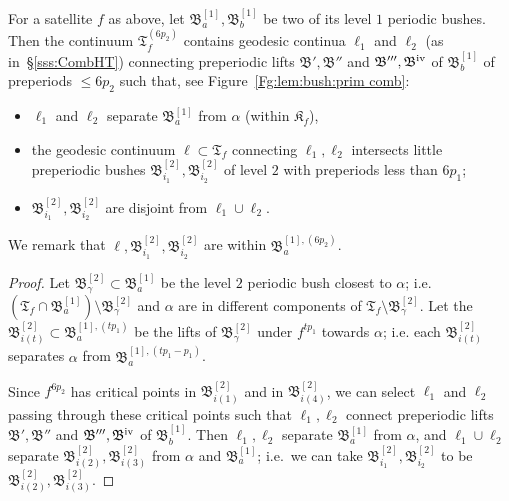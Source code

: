 \documentclass{amsart}
\newcommand{\filled}{{\mathfrak K }}
\newcommand{\Hub}{{\mathfrak T}}
\newcommand{\bush}{{\mathfrak B }}
\newcommand{\1}{{\mathbb 1 }}
\newcommand{\rn}[1]{\text{\romannumeral#1}}%
\begin{document}
\begin{lem} 
\label{lem:bush:prim comb} For a satellite $f$ as above, let $\bush^{[1]}_{a}, \bush^{[1]}_{b}$ be two of its level $1$ periodic bushes. Then the continuum $\Hub^{(6p_2)}_f$ contains geodesic continua $\ell_1$ and $\ell_2$ (as in~\S\ref{sss:CombHT}) connecting preperiodic lifts $\bush',\bush''$  and $\bush''',\bush^\rn{4}$ of $\bush^{[1]}_b$ of preperiods $\le 6 p_2$ such that, see Figure~\ref{Fg:lem:bush:prim comb}:
\begin{itemize}
\item $\ell_1$ and $\ell_2$ separate $\bush^{[1]}_a$ from $\alpha$ (within $\filled_f$),
\item the geodesic continuum  $\ell\subset \Hub_f$ connecting $\ell_1, \ell_2$ intersects little preperiodic bushes $\bush_{i_1}^{[2]},\bush^{[2]}_{i_2}$ of level $2$ with preperiods less than $6p_1$;
\item  $\bush_{i_1}^{[2]},\bush^{[2]}_{i_2}$ are disjoint from $\ell_1\cup \ell_2$.
\end{itemize}
 \end{lem}
 \noindent We remark that $\ell,\bush_{i_1}^{[2]},\bush^{[2]}_{i_2}$ are within $ \bush^{[1],(6 p_2)}_a$.
 \begin{proof}
Let $\bush_\gamma^{[2]}\subset \bush^{[1]}_a$ be the level $2$ periodic bush closest to $\alpha$; i.e. $(\Hub_f\cap \bush^{[1]}_a)\setminus \bush^{[2]}_\gamma$ and $\alpha$ are in different components of $\Hub_f\setminus \bush_\gamma^{[2]}$. Let the $\bush_{i(t)}^{[2]}\subset  \bush^{[1],(tp_1)}_a$ be the lifts of $\bush_\gamma^{[2]}$ under $f^{t p_1}$ towards $\alpha$; i.e. each  $\bush_{i(t)}^{[2]}$ separates $\alpha$ from  $\bush^{[1],(tp_1-p_1)}_a$. 

Since $f^{6p_2}$ has critical points in $\bush^{[2]}_{i(1)}$ and in $\bush_{i(4)}^{[2]}$, we can select $\ell_1$ and $\ell_2$ passing through these critical points such that $\ell_1,\ell_2$ connect preperiodic lifts $\bush',\bush''$  and $\bush''',\bush^\rn{4}$ of $\bush^{[1]}_b$. Then $\ell_1, \ell_2$ separate $\bush^{[1]}_a$ from $\alpha$, and $\ell_1\cup \ell_2$ separate $\bush^{[2]}_{i(2)},\bush^{[2]}_{i(3)}$ from $\alpha$ and $\bush^{[1]}_a$; i.e.~we can take $\bush^{[2]}_{i_1},\bush^{[2]}_{i_2}$ to be $\bush^{[2]}_{i(2)},\bush^{[2]}_{i(3)}$.
 \end{proof}
\end{document}
